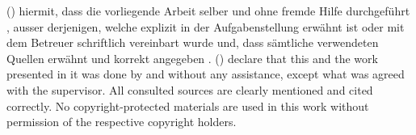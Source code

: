 

\pagebreak
{}

%
    {%
     (\thesisauthors[, ]{})  hiermit, dass  die vorliegende Arbeit selber und ohne fremde Hilfe durchgef\"uhrt , ausser derjenigen, welche explizit in der Aufgabenstellung erw\"ahnt ist oder mit dem Betreuer schriftlich vereinbart wurde und, dass  s\"amtliche verwendeten Quellen erw\"ahnt und korrekt angegeben .
    }%
    {%
     (\thesisauthors[, ]{}) declare that this \thesistype{} and the work presented in it was done by  and without any assistance, except what was agreed with the  supervisor. All consulted sources are clearly mentioned and cited correctly. No copyright-protected materials are used in this work without permission of the respective copyright holders.
    }%
\vfill
\newcommand*{\SignatureAndDate}[1]{%
    \par\noindent\makebox[7cm]{\hrulefill} \hfill\makebox[7cm]{\hrulefill}%
    \\\noindent\makebox[7cm][c]{\ifthenelse{\equal{\thesislanguage}{ngerman}}{Ort und Datum}{Place and date}} \hfill \makebox[7cm][c]{#1}%
    \vspace{2cm}%
}%


